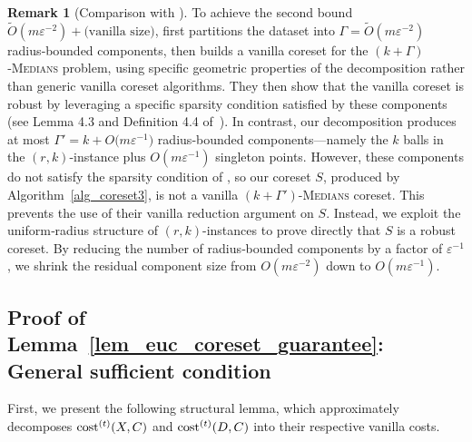 \documentclass[11pt,letterpaper]{article}
\theoremstyle{definition}
\newtheorem{remark}[theorem]{Remark}
\newcommand{\eps}{\varepsilon}
\newcommand{\ProblemName}[1]{\textsc{#1}}
\begin{document}
\begin{remark}[Comparison with \cite{jiang2025coresets}]
To achieve the second bound \(\tilde{O}(m\eps^{-2}) + \text{(vanilla size)}\), \cite{jiang2025coresets} first partitions the dataset into \(\Gamma = \tilde{O}(m\eps^{-2})\) radius‐bounded components, then builds a vanilla coreset for the \ProblemName{$(k + \Gamma)$‐Medians} problem, using specific geometric properties of the decomposition rather than generic vanilla coreset algorithms.
%
%
They then show that the vanilla coreset is robust by leveraging a specific sparsity condition satisfied by these components (see Lemma 4.3 and Definition 4.4 of~\cite{jiang2025coresets}).
%
In contrast, our decomposition produces at most 
$
\Gamma' = k + O\bigl(m\eps^{-1}\bigr)
$
radius‐bounded components---namely the \(k\) balls in the \((r,k)\)-instance plus \(O(m\eps^{-1})\) singleton points. However, these components do not satisfy the sparsity condition of \cite{jiang2025coresets}, so our coreset \(S\), produced by Algorithm~\ref{alg_coreset3}, is not a vanilla \ProblemName{$(k + \Gamma')$-Medians} coreset. This prevents the use of their vanilla reduction argument on $S$. 
%
Instead, we exploit the uniform‐radius structure of \((r,k)\)-instances to prove directly that \(S\) is a robust coreset. 
%
By reducing the number of radius‐bounded components by a factor of \(\eps^{-1}\), we shrink the residual component size from \(O(m\eps^{-2})\) down to \(O(m\eps^{-1})\).
\end{remark}



\subsection{Proof of Lemma~\ref{lem_euc_coreset_guarantee}: General sufficient condition}

First, we present the following structural lemma, which approximately decomposes \( \cost^{(t)}(X,C) \) and \( \cost^{(t)}(D,C) \) into their respective vanilla costs.
\end{document}
